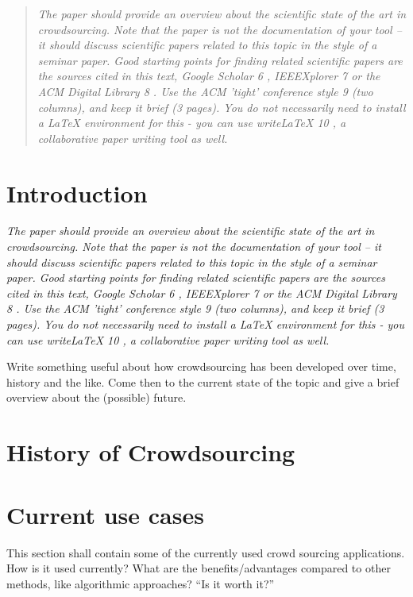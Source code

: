 \documentclass{acm_proc_article-sp}
\begin{document}
\maketitle
\begin{abstract}
\textit{The paper should provide an overview about the scientific state of the art in crowdsourcing. Note
that the paper is not the documentation of your tool – it should discuss scientific papers related
to this topic in the style of a seminar paper. Good starting points for finding related scientific
papers are the sources cited in this text, Google Scholar 6 , IEEEXplorer 7 or the ACM Digital
Library 8 . Use the ACM ’tight’ conference style 9 (two columns), and keep it brief (3 pages). You
do not necessarily need to install a LaTeX environment for this - you can use writeLaTeX 10 , a
collaborative paper writing tool as well.}
\end{abstract}



\section{Introduction}
\textit{ The paper should provide an overview about the scientific state of the art in crowdsourcing. Note
that the paper is not the documentation of your tool – it should discuss scientific papers related
to this topic in the style of a seminar paper. Good starting points for finding related scientific
papers are the sources cited in this text, Google Scholar 6 , IEEEXplorer 7 or the ACM Digital
Library 8 . Use the ACM ’tight’ conference style 9 (two columns), and keep it brief (3 pages). You
do not necessarily need to install a LaTeX environment for this - you can use writeLaTeX 10 , a
collaborative paper writing tool as well.
}

Write something useful about how crowdsourcing has been developed over time, history and the like.
Come then to the current state of the topic and give a brief overview about the (possible) future.


\section{History of Crowdsourcing}

\section{Current use cases}
This section shall contain some of the currently used crowd sourcing applications. How is it used currently? What are the benefits/advantages compared to other methods, like algorithmic approaches? ``Is it worth it?''
\end{document}
